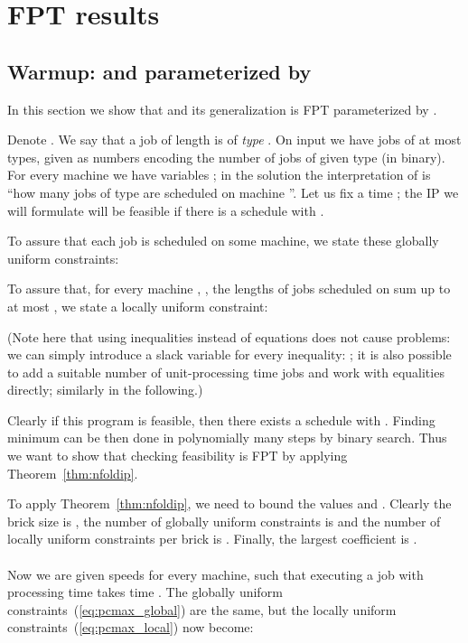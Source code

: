 \documentclass{llncs}
\newcommand{\FPT}{{\sf FPT}\xspace}
\begin{document}
\section{\FPT results}
\label{sec:scheduling}
\subsection{Warmup:  and  parameterized by }

In this section we show that  and its generalization  is \FPT parameterized by .

Denote . We say that a job of length  is of \textit{type} . On input we have  jobs of at most  types, given as numbers  encoding the number of jobs of given type (in binary). For every machine  we have variables ; in the solution the interpretation of  is ``how many jobs of type  are scheduled on machine ''. Let us fix a time ; the IP we will formulate will be feasible if there is a schedule with .

To assure that each job is scheduled on some machine, we state these globally uniform constraints:


To assure that, for every machine , , the lengths of jobs scheduled on  sum up to at most , we state a locally uniform constraint:


(Note here that using inequalities instead of equations does not cause problems: we can simply introduce a slack variable for every inequality: ; it is also possible to add a suitable number of unit-processing time jobs and work with equalities directly; similarly in the following.)

Clearly if this program is feasible, then there exists a schedule with . Finding minimum  can be then done in polynomially many steps by binary search. Thus we want to show that checking feasibility is \FPT by applying Theorem~\ref{thm:nfoldip}.

To apply Theorem~\ref{thm:nfoldip}, we need to bound the values  and . Clearly the brick size is , the number of globally uniform constraints is  and the number of locally uniform constraints per brick is . Finally, the largest coefficient is .

\paragraph{} Now we are given speeds  for every machine, such that executing a job with processing time  takes time . The globally uniform constraints~(\ref{eq:pcmax_global}) are the same, but the locally uniform constraints~(\ref{eq:pcmax_local}) now become:
\end{document}
